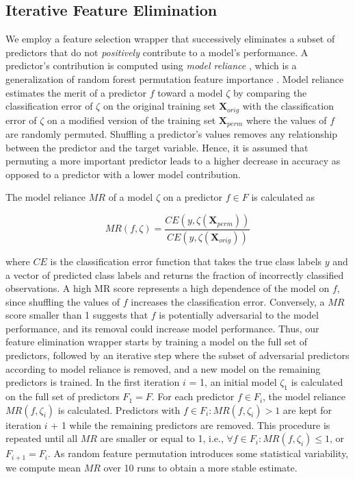 \documentclass[
  oneside]{book}
\begin{document}
\hypertarget{iml-workflow-fe}{%
\subsection{Iterative Feature Elimination}\label{iml-workflow-fe}}

We employ a feature selection wrapper that successively eliminates a subset of predictors that do not \emph{positively} contribute to a model's performance.
A predictor's contribution is computed using \emph{model reliance} \autocite{Fisher:ModelReliance2019}, which is a generalization of random forest permutation feature importance \autocite{Breiman:RandomForests2001}.
Model reliance estimates the merit of a predictor \(f\) toward a model \(\zeta\) by comparing the classification error of \(\zeta\) on the original training set \(\mathbf{X}_{orig}\) with the classification error of \(\zeta\) on a modified version of the training set \(\mathbf{X}_{perm}\) where the values of \(f\) are randomly permuted.
Shuffling a predictor's values removes any relationship between the predictor and the target variable.
Hence, it is assumed that permuting a more important predictor leads to a higher decrease in accuracy as opposed to a predictor with a lower model contribution.

The model reliance \(MR\) of a model \(\zeta\) on a predictor \(f\in F\) is calculated as

\begin{equation}
MR(f,\zeta) = \frac{CE(y,\zeta(\mathbf{X}_{perm}))}{CE(y,\zeta(\mathbf{X}_{orig}))}
\label{eq:model-reliance}
\end{equation}

where \(CE\) is the classification error function that takes the true class labels \(y\) and a vector of predicted class labels and returns the fraction of incorrectly classified observations.
A high MR score represents a high dependence of the model on \(f\), since shuffling the values of \(f\) increases the classification error.
Conversely, a \(MR\) score smaller than 1 suggests that \(f\) is potentially adversarial to the model performance, and its removal could increase model performance. Thus, our feature elimination wrapper starts by training a model on the full set of predictors, followed by an iterative step where the subset of adversarial predictors according to model reliance is removed, and a new model on the remaining predictors is trained.
In the first iteration \(i\) = 1, an initial model \(\zeta_1\) is calculated on the full set of predictors \(F_1 = F\).
For each predictor \(f \in F_i\), the model reliance \(MR(f,\zeta_i)\) is calculated.
Predictors with \(f\in F_i:MR(f,\zeta_i)>1\) are kept for iteration \(i\) + 1 while the remaining predictors are removed.
This procedure is repeated until all \(MR\) are smaller or equal to 1, i.e., \(\forall f \in F_i: MR(f,\zeta_i) \leq 1\), or \(F_{i+1} = F_i\).
As random feature permutation introduces some statistical variability, we compute mean \(MR\) over 10 runs to obtain a more stable estimate.
\end{document}
